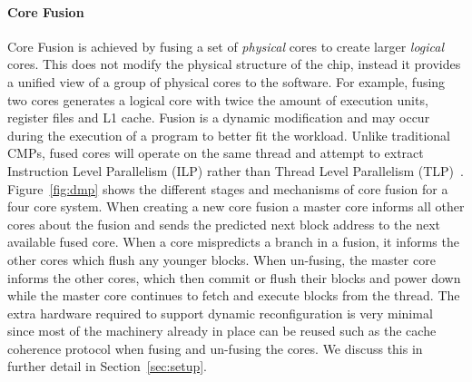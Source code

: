 \paragraph{Core Fusion} 
Core Fusion is achieved by fusing a set of \textit{physical} cores to create larger \textit{logical} cores.
This does not modify the physical structure of the chip, instead it provides a unified view of a group of physical cores to the software.
For example, fusing two cores generates a logical core with twice the amount of execution units, register files and L1 cache.
Fusion is a dynamic modification and may occur during the execution of a program to better fit the workload.
Unlike traditional CMPs, fused cores will operate on the same thread and attempt to extract Instruction Level Parallelism (ILP) rather than Thread Level Parallelism (TLP)~\cite{micolet2016dmpstream,pricopi2012bahurupi}.
Figure~\ref{fig:dmp} shows the different stages and mechanisms of core fusion for a four core system.
When creating a new core fusion a master core informs all other cores about the fusion and sends the predicted next block address to the next available fused core.
When a core mispredicts a branch in a fusion, it informs the other cores which flush any younger blocks.
When un-fusing, the master core informs the other cores, which then commit or flush their blocks and power down while the master core continues to fetch and execute blocks from the thread.
The extra hardware required to support dynamic reconfiguration is very minimal~\cite{kim2007tflex} since most of the machinery already in place can be reused such as the cache coherence protocol when fusing and un-fusing the cores.
We discuss this in further detail in Section~\ref{sec:setup}.
